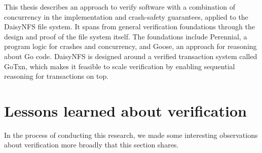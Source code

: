 This thesis describes an approach to verify software with a combination of
concurrency in the implementation and crash-safety guarantees, applied to the
DaisyNFS file system. It spans from general verification foundations
through the design and proof of the file system itself. The foundations
include Perennial, a program logic for crashes and concurrency, and Goose, an
approach for reasoning about Go code. DaisyNFS is designed around a verified
transaction system called GoTxn, which makes it feasible to scale verification
by enabling sequential reasoning for transactions on top.

\section{Lessons learned about verification}

In the process of conducting this research, we made some interesting
observations about verification more broadly that this section shares.


